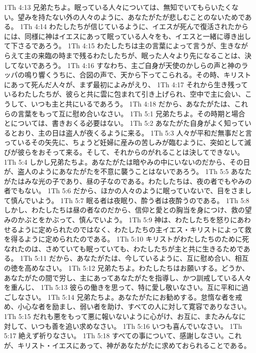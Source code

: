 1Th 4:13  兄弟たちよ。眠っている人々については、無知でいてもらいたくない。望みを持たない外の人々のように、あなたがたが悲しむことのないためである。
1Th 4:14  わたしたちが信じているように、イエスが死んで復活されたからには、同様に神はイエスにあって眠っている人々をも、イエスと一緒に導き出して下さるであろう。
1Th 4:15  わたしたちは主の言葉によって言うが、生きながらえて主の来臨の時まで残るわたしたちが、眠った人々より先になることは、決してないであろう。
1Th 4:16  すなわち、主ご自身が天使のかしらの声と神のラッパの鳴り響くうちに、合図の声で、天から下ってこられる。その時、キリストにあって死んだ人々が、まず最初によみがえり、
1Th 4:17  それから生き残っているわたしたちが、彼らと共に雲に包まれて引き上げられ、空中で主に会い、こうして、いつも主と共にいるであろう。
1Th 4:18  だから、あなたがたは、これらの言葉をもって互に慰め合いなさい。
1Th 5:1  兄弟たちよ。その時期と場合とについては、書きおくる必要はない。
1Th 5:2  あなたがた自身がよく知っているとおり、主の日は盗人が夜くるように来る。
1Th 5:3  人々が平和だ無事だと言っているその矢先に、ちょうど妊婦に産みの苦しみが臨むように、突如として滅びが彼らをおそって来る。そして、それからのがれることは決してできない。
1Th 5:4  しかし兄弟たちよ。あなたがたは暗やみの中にいないのだから、その日が、盗人のようにあなたがたを不意に襲うことはないであろう。
1Th 5:5  あなたがたはみな光の子であり、昼の子なのである。わたしたちは、夜の者でもやみの者でもない。
1Th 5:6  だから、ほかの人々のように眠っていないで、目をさまして慎んでいよう。
1Th 5:7  眠る者は夜眠り、酔う者は夜酔うのである。
1Th 5:8  しかし、わたしたちは昼の者なのだから、信仰と愛との胸当を身につけ、救の望みのかぶとをかぶって、慎んでいよう。
1Th 5:9  神は、わたしたちを怒りにあわせるように定められたのではなく、わたしたちの主イエス・キリストによって救を得るように定められたのである。
1Th 5:10  キリストがわたしたちのために死なれたのは、さめていても眠っていても、わたしたちが主と共に生きるためである。
1Th 5:11  だから、あなたがたは、今しているように、互に慰め合い、相互の徳を高めなさい。
1Th 5:12  兄弟たちよ。わたしたちはお願いする。どうか、あなたがたの間で労し、主にあってあなたがたを指導し、かつ訓戒している人々を重んじ、
1Th 5:13  彼らの働きを思って、特に愛し敬いなさい。互に平和に過ごしなさい。
1Th 5:14  兄弟たちよ。あなたがたにお勧めする。怠惰な者を戒め、小心な者を励まし、弱い者を助け、すべての人に対して寛容でありなさい。
1Th 5:15  だれも悪をもって悪に報いないように心がけ、お互に、またみんなに対して、いつも善を追い求めなさい。
1Th 5:16  いつも喜んでいなさい。
1Th 5:17  絶えず祈りなさい。
1Th 5:18  すべての事について、感謝しなさい。これが、キリスト・イエスにあって、神があなたがたに求めておられることである。
